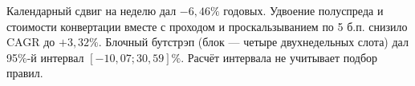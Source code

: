 \documentclass[12pt,a4paper]{article}
\begin{document}
Календарный сдвиг на неделю дал $-6{,}46\%$ годовых. Удвоение полуспреда и стоимости конвертации вместе с проходом и проскальзыванием по 5 б.п. снизило CAGR до $+3{,}32\%$. Блочный бутстрэп (блок --- четыре двухнедельных слота) дал 95\%-й интервал $[-10{,}07;30{,}59]\%$. Расчёт интервала не учитывает подбор правил.
\end{document}

